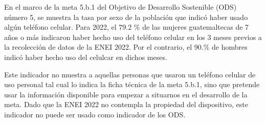 En el marco de la meta 5.b.1 del Objetivo de Desarrollo Sostenible (ODS) número 5, se muestra la tasa por sexo de la población que indicó haber usado algún teléfono celular. Para 2022, el 79.2 \% de las mujeres guatemaltecas de 7 años o más indicaron haber hecho uso del teléfono celular en los 3 meses previos a la recolección de datos de la ENEI 2022. Por el contrario, el 90.\% de hombres indicó haber hecho uso del celulcar en dichos meses. 

Este indicador no muestra a aquellas personas que usaron un teléfono celular de uso personal tal cual lo indica la ficha técnica de la meta 5.b.1, sino que pretende usar la información disponible para empezar a situarnos en el desarrollo de la meta. Dado que la ENEI 2022 no contempla la propiedad del dispositivo, este indicador no puede ser usado como indicador de los ODS. 